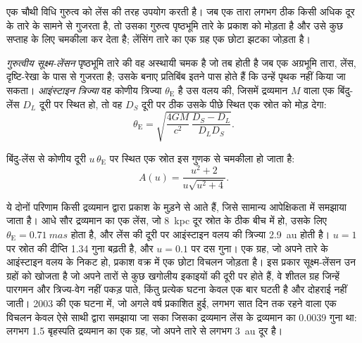 एक चौथी विधि गुरुत्व को लेंस की तरह उपयोग करती है। जब एक तारा लगभग ठीक
किसी अधिक दूर के तारे के सामने से गुजरता है, तो उसका गुरुत्व पृष्ठभूमि तारे के प्रकाश को मोड़ता है
और उसे कुछ सप्ताह के लिए चमकीला कर देता है; लेंसिंग तारे का एक ग्रह
एक छोटा झटका जोड़ता है।

\begin{definition}[गुरुत्वीय सूक्ष्म-लेंसन; आइंस्टाइन त्रिज्या]\label{def:b3:exoplanets:microlensing}
\emph{गुरुत्वीय सूक्ष्म-लेंसन} पृष्ठभूमि तारे की वह अस्थायी चमक है
जो तब होती है जब एक अग्रभूमि तारा, लेंस,
दृष्टि-रेखा के पास से गुजरता है; उसके बनाए प्रतिबिंब इतने पास होते हैं
कि उन्हें पृथक नहीं किया जा सकता। \emph{आइंस्टाइन त्रिज्या}
वह कोणीय त्रिज्या $\theta_\mathrm E$ है उस वलय की, जिसमें
द्रव्यमान $M$ वाला एक बिंदु-लेंस $D_L$ दूरी पर स्थित हो, तो वह
$D_S$ दूरी पर ठीक उसके पीछे स्थित एक स्रोत को मोड़ देगा:
\[
\theta_\mathrm E = \sqrt{\frac{4GM}{c^2}\,\frac{D_S - D_L}{D_L D_S}} .
\]
\end{definition}

\begin{proposition}[बिंदु-लेंस आवर्धन]\label{prop:b3:exoplanets:magnification}
बिंदु-लेंस से कोणीय दूरी $u\,\theta_\mathrm E$ पर स्थित एक स्रोत
इस गुणक से चमकीला हो जाता है:
\[
A(u) = \frac{u^2 + 2}{u\sqrt{u^2 + 4}} .
\]
\end{proposition}

\admitted

ये दोनों परिणाम किसी द्रव्यमान द्वारा प्रकाश के मुड़ने से आते हैं, जिसे सामान्य
आपेक्षिकता में समझाया जाता है। आधे सौर द्रव्यमान का एक लेंस, जो
\qty{8}{kpc} दूर स्रोत के ठीक बीच में हो, उसके लिए $\theta_\mathrm E = \qty{0.71}{mas}$ होता है, और लेंस की दूरी पर आइंस्टाइन
वलय की त्रिज्या \qty{2.9}{au} होती है। $u = 1$ पर
स्रोत की दीप्ति 1.34 गुना बढ़ती है, और $u = 0.1$ पर दस गुना। एक
ग्रह, जो अपने तारे के आइंस्टाइन वलय के निकट हो, प्रकाश वक्र में एक छोटा
विचलन जोड़ता है। इस प्रकार सूक्ष्म-लेंसन उन ग्रहों को खोजता है जो अपने तारों से
कुछ खगोलीय इकाइयों की दूरी पर होते हैं, वे शीतल ग्रह जिन्हें पारगमन और त्रिज्य-वेग नहीं पकड़ पाते,
किंतु प्रत्येक घटना केवल एक बार घटती है और दोहराई नहीं जाती। 2003 की एक घटना में,
जो अगले वर्ष प्रकाशित हुई, लगभग सात दिन तक रहने वाला एक विचलन केवल
ऐसे साथी द्वारा समझाया जा सका जिसका द्रव्यमान लेंस के द्रव्यमान का $\num{0.0039}$ गुना था:
लगभग 1.5 बृहस्पति द्रव्यमान का एक ग्रह, जो
अपने तारे से लगभग \qty{3}{au} दूर है।

